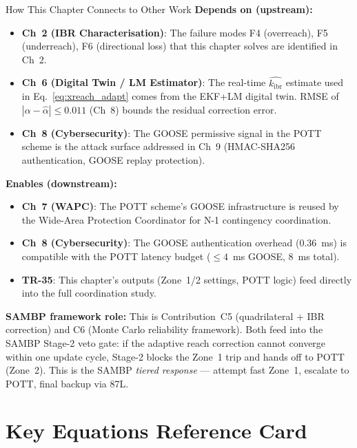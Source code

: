 \documentclass[12pt,a4paper]{article}
\newcommand{\kibr}{k_\mathrm{ibr}}
\begin{document}
\begin{archbox}{How This Chapter Connects to Other Work}
\textbf{Depends on (upstream):}
\begin{itemize}[nosep]
  \item \textbf{Ch~2 (IBR Characterisation)}: The failure modes F4 (overreach), F5 (underreach), F6 (directional loss) that this chapter solves are identified in Ch~2.
  \item \textbf{Ch~6 (Digital Twin / LM Estimator)}: The real-time $\hat{\kibr}$ estimate used in Eq.~\eqref{eq:xreach_adapt} comes from the EKF+LM digital twin. RMSE of $|\alpha - \hat{\alpha}| \leq 0.011$ (Ch~8) bounds the residual correction error.
  \item \textbf{Ch~8 (Cybersecurity)}: The GOOSE permissive signal in the POTT scheme is the attack surface addressed in Ch~9 (HMAC-SHA256 authentication, GOOSE replay protection).
\end{itemize}

\textbf{Enables (downstream):}
\begin{itemize}[nosep]
  \item \textbf{Ch~7 (WAPC)}: The POTT scheme's GOOSE infrastructure is reused by the Wide-Area Protection Coordinator for N-1 contingency coordination.
  \item \textbf{Ch~8 (Cybersecurity)}: The GOOSE authentication overhead (0.36~ms) is compatible with the POTT latency budget ($\leq 4$~ms GOOSE, 8~ms total).
  \item \textbf{TR-35}: This chapter's outputs (Zone~1/2 settings, POTT logic) feed directly into the full coordination study.
\end{itemize}

\textbf{SAMBP framework role:} This is Contribution~C5 (quadrilateral + IBR correction) and C6 (Monte Carlo reliability framework). Both feed into the SAMBP Stage-2 veto gate: if the adaptive reach correction cannot converge within one update cycle, Stage-2 blocks the Zone~1 trip and hands off to POTT (Zone~2). This is the SAMBP \emph{tiered response} --- attempt fast Zone~1, escalate to POTT, final backup via 87L.
\end{archbox}

\section{Key Equations Reference Card}
\end{document}
